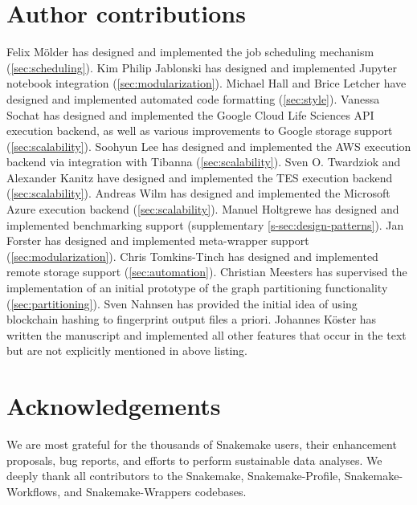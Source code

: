 \documentclass[parskip=half]{scrartcl}
\begin{document}
\section{Author contributions}
Felix Mölder has designed and implemented the job scheduling mechanism (\autoref{sec:scheduling}).
Kim Philip Jablonski has designed and implemented Jupyter notebook integration (\autoref{sec:modularization}).
Michael Hall and Brice Letcher have designed and implemented automated code formatting (\autoref{sec:style}).
Vanessa Sochat has designed and implemented the Google Cloud Life Sciences API execution backend, as well as various improvements to Google storage support (\autoref{sec:scalability}).
Soohyun Lee has designed and implemented the AWS execution backend via integration with Tibanna (\autoref{sec:scalability}).
Sven O.
Twardziok and Alexander Kanitz have designed and implemented the TES execution backend (\autoref{sec:scalability}).
Andreas Wilm has designed and implemented the Microsoft Azure execution backend (\autoref{sec:scalability}).
Manuel Holtgrewe has designed and implemented benchmarking support (supplementary \autoref{s-sec:design-patterns}).
Jan Forster has designed and implemented meta-wrapper support (\autoref{sec:modularization}).
Chris Tomkins-Tinch has designed and implemented remote storage support (\autoref{sec:automation}).
Christian Meesters has supervised the implementation of an initial prototype of the graph partitioning functionality (\autoref{sec:partitioning}).
Sven Nahnsen has provided the initial idea of using blockchain hashing to fingerprint output files a priori.
Johannes Köster has written the manuscript and implemented all other features that occur in the text but are not explicitly mentioned in above listing.

\section{Acknowledgements}
We are most grateful for the thousands of Snakemake users, their enhancement proposals, bug reports, and efforts to perform sustainable data analyses.
We deeply thank all contributors to the Snakemake, Snakemake-Profile, Snakemake-Workflows, and Snakemake-Wrappers codebases.

\printbibliography
\end{document}
